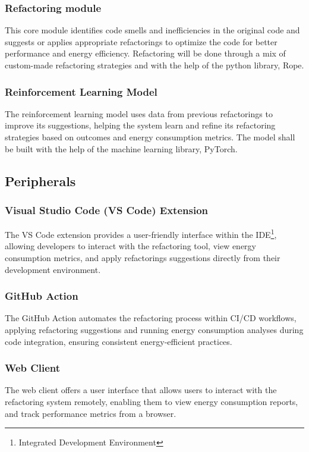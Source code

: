 \documentclass{article}
\begin{document}
\subsubsection*{Refactoring module}
This core module identifies code smells and inefficiencies in the original code and suggests or applies appropriate refactorings to optimize the code for better performance and energy efficiency. Refactoring will be done through a mix of custom-made refactoring strategies and with the help of the python library, Rope.

\subsubsection*{Reinforcement Learning Model}
The reinforcement learning model uses data from previous refactorings to improve its suggestions, helping the system learn and refine its refactoring strategies based on outcomes and energy consumption metrics. The model shall be built with the help of the machine learning library, PyTorch.

\subsection{Peripherals}

\subsubsection*{Visual Studio Code (VS Code) Extension}
The VS Code extension provides a user-friendly interface within the IDE\footnote{Integrated Development Environment}, allowing developers to interact with the refactoring tool, view energy consumption metrics, and apply refactorings suggestions directly from their development environment.

\subsubsection*{GitHub Action}
The GitHub Action automates the refactoring process within CI/CD workflows, applying refactoring suggestions and running energy consumption analyses during code integration, ensuring consistent energy-efficient practices.

\subsubsection*{Web Client}
The web client offers a user interface that allows users to interact with the refactoring system remotely, enabling them to view energy consumption reports, and track performance metrics from a browser.
\end{document}
